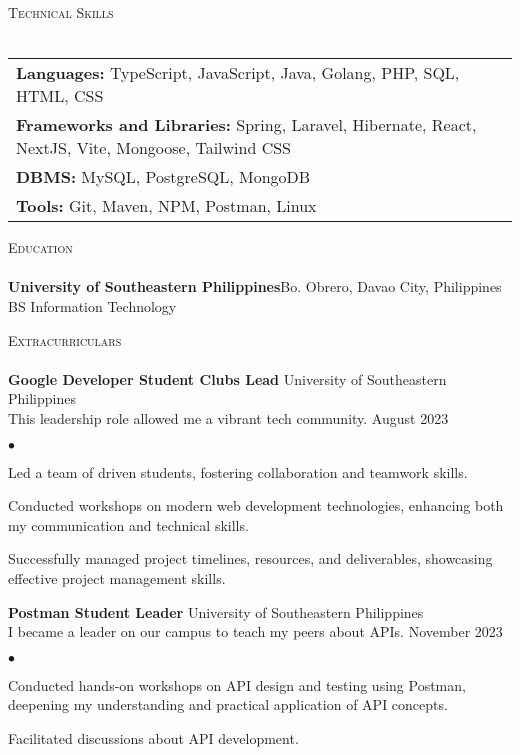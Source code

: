 \documentclass[a4paper]{article}
\newcommand{\lineunder} {
        \vspace*{-8pt} \\
        \hspace*{-18pt} \hrulefill \\
    }
\newcommand{\header} [1] {
        {\vspace*{4mm} \hspace*{-18pt}\vspace*{8pt} \textsc{#1}}
        \vspace*{-6pt} \lineunder
    }
\newenvironment{achievements}{
        \begin{list}
            {$\bullet$}{\topsep 0pt \itemsep -2pt}}{\vspace*{4pt}
        \end{list}
    }
\begin{document}
    \renewcommand{\arraystretch}{1.5}
    \header{Technical Skills}
    \begin{tabular}{ l l }
        \textbf{Languages:} TypeScript, JavaScript, Java, Golang, PHP, SQL, HTML, CSS                   \\
        \textbf{Frameworks and Libraries:} Spring, Laravel, Hibernate, React, NextJS, Vite, Mongoose, Tailwind CSS \\
        \textbf{DBMS:} MySQL, PostgreSQL, MongoDB                                              \\
        \textbf{Tools:} Git, Maven, NPM, Postman, Linux                                       \\
    \end{tabular}
    
    \header{Education}
    \textbf{University of Southeastern Philippines}\hfill Bo. Obrero, Davao City, Philippines\\
    BS Information Technology 


\header{Extracurriculars}
\textbf{Google Developer Student Clubs Lead} \hfill University of Southeastern Philippines\\
\vspace{1mm}
This leadership role allowed me a vibrant tech community. \hfill August 2023\\
\begin{achievements}
    \item Led a team of driven students, fostering collaboration and teamwork skills.
    \item Conducted workshops on modern web development technologies, enhancing both my communication and technical skills.
    \item Successfully managed project timelines, resources, and deliverables, showcasing effective project management skills.
\end{achievements}
\vspace*{2mm}
\textbf{Postman Student Leader} \hfill University of Southeastern Philippines\\
\vspace{1mm}
I became a leader on our campus to teach my peers about APIs. \hfill November 2023\\
\begin{achievements}
    \item Conducted hands-on workshops on API design and testing using Postman, deepening my understanding and practical application of API concepts.
    \item Facilitated discussions about API development.
\end{achievements}

    
\end{document}
